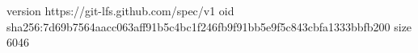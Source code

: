 version https://git-lfs.github.com/spec/v1
oid sha256:7d69b7564aacc063aff91b5c4bc1f246fb9f91bb5e9f5c843cbfa1333bbfb200
size 6046
